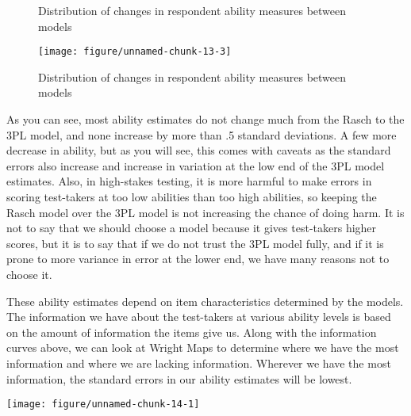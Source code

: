\documentclass{article}\usepackage[]{graphicx}\usepackage[]{color}
\makeatletter
\def\maxwidth{ %
  \ifdim\Gin@nat@width>\linewidth
    \linewidth
  \else
    \Gin@nat@width
  \fi
}
\newenvironment{knitrout}{}{} %
\makeatother
\begin{document}
\begin{enumerate}
\begin{knitrout}
\begin{figure}[H]
\caption[Distribution of changes in respondent ability measures between models]{Distribution of changes in respondent ability measures between models}\label{fig:unnamed-chunk-132}
\end{figure}

\begin{figure}[H]

{\centering \texttt{[image: figure/unnamed-chunk-13-3]} 

}

\caption[Distribution of changes in respondent ability measures between models]{Distribution of changes in respondent ability measures between models}\label{fig:unnamed-chunk-133}
\end{figure}


\end{knitrout}
\raggedright
As you can see, most ability estimates do not change much from the Rasch to the 3PL model, and none increase by more than .5 standard deviations. A few more decrease in ability, but as you will see, this comes with caveats as the standard errors also increase and increase in variation at the low end of the 3PL model estimates. Also, in high-stakes testing, it is more harmful to make errors in scoring test-takers at too low abilities than too high abilities, so keeping the Rasch model over the 3PL model is not increasing the chance of doing harm. It is not to say that we should choose a model because it gives test-takers higher scores, but it is to say that if we do not trust the 3PL model fully, and if it is prone to more variance in error at the lower end, we have many reasons not to choose it.
\raggedright

These ability estimates depend on item characteristics determined by the models. The information we have about the test-takers at various ability levels is based on the amount of information the items give us. Along with the information curves above, we can look at Wright Maps to determine where we have the most information and where we are lacking information. Wherever we have the most information, the standard errors in our ability estimates will be lowest.

\centering
\begin{knitrout}
\color{fgcolor}

{\centering \texttt{[image: figure/unnamed-chunk-14-1]} 

}





\end{knitrout}
\end{enumerate}
\end{document}
